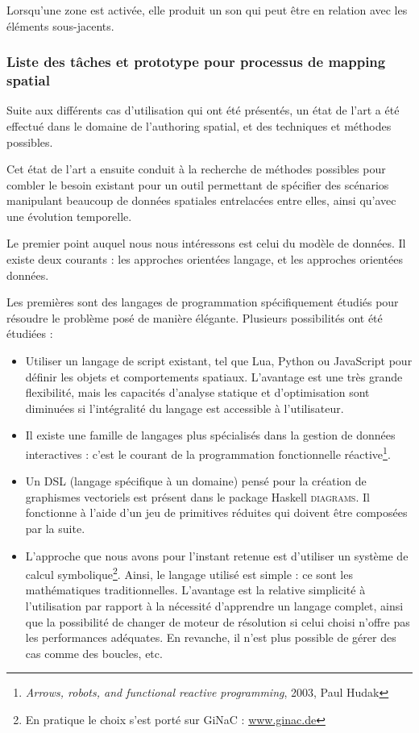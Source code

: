 \documentclass[french,12pt]{article}
\begin{document}
Lorsqu'une zone est activée, elle produit un son qui peut être en relation avec les éléments sous-jacents. %

\subsubsection{Liste des tâches et prototype pour processus de mapping spatial}
Suite aux différents cas d'utilisation qui ont été présentés, un état de l'art %
a été effectué dans le domaine de l'authoring spatial, et des techniques et méthodes possibles.

Cet état de l'art a ensuite conduit à la recherche de méthodes possibles pour combler le besoin existant pour un outil permettant de spécifier des scénarios manipulant beaucoup de données spatiales entrelacées entre elles, ainsi qu'avec une évolution temporelle.

Le premier point auquel nous nous intéressons est celui du modèle de données. Il existe deux courants : les approches orientées langage, et les approches orientées données. 

Les premières sont des langages de programmation spécifiquement étudiés pour résoudre le problème posé de manière élégante. Plusieurs possibilités ont été étudiées : 
\begin{itemize}
\item Utiliser un langage de script existant, tel que Lua, Python ou JavaScript pour définir les objets et comportements spatiaux. L'avantage est une très grande flexibilité, mais les capacités d'analyse statique et d'optimisation sont diminuées si l'intégralité du langage est accessible à l'utilisateur.
\item Il existe une famille de langages plus spécialisés dans la gestion de données interactives : c'est le courant de la programmation fonctionnelle réactive\footnote{\textit{Arrows, robots, and functional reactive programming}, 2003, Paul Hudak}.
\item Un DSL (langage spécifique à un domaine) pensé pour la création de graphismes vectoriels est présent dans le package Haskell \textsc{diagrams}. Il fonctionne à l'aide d'un jeu de primitives réduites qui doivent être composées par la suite.
\item L'approche que nous avons pour l'instant retenue est d'utiliser un système de calcul symbolique\footnote{En pratique le choix s'est porté sur GiNaC : \url{www.ginac.de}}. Ainsi, le langage utilisé est simple : ce sont les mathématiques traditionnelles. L'avantage est la relative simplicité à l'utilisation par rapport à la nécessité d'apprendre un langage complet, ainsi que la possibilité de changer de moteur de résolution si celui choisi n'offre pas les performances adéquates.
En revanche, il n'est plus possible de gérer des cas comme des boucles, etc.
\end{itemize}
\end{document}
